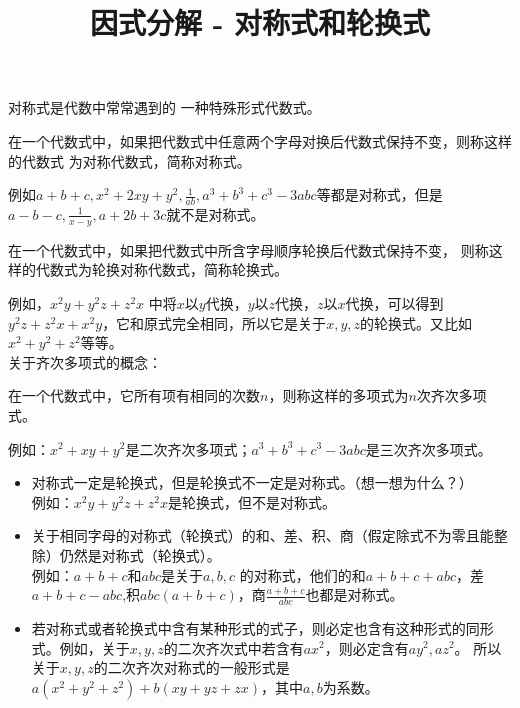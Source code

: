 \documentclass[windows,csize4]{BHCexam}
\title{因式分解 - 对称式和轮换式}
\begin{document}
\maketitle

\begin{groups}
    对称式是代数中常常遇到的 一种特殊形式代数式。\\
    \fbox
    {
        \parbox{\textwidth}
        {
            在一个代数式中，如果把代数式中任意两个字母对换后代数式保持不变，则称这样的代数式
            为对称代数式，简称对称式。
        }
    }
    例如$a+b+c,x^2+2xy+y^2,\frac{1}{ab},a^3+b^3+c^3-3abc$等都是对称式，但是
    $a-b-c,\frac{1}{x-y},a+2b+3c$就不是对称式。 \\

    \fbox
    {
        \parbox{\textwidth}
        {
            在一个代数式中，如果把代数式中所含字母顺序轮换后代数式保持不变，
            则称这样的代数式为轮换对称代数式，简称轮换式。
        }
    }
    例如，$x^2y+y^2z+z^2x$ 中将$x$以$y$代换，$y$以$z$代换，$z$以$x$代换，可以得到
    $y^2z+z^2x+x^2y$，它和原式完全相同，所以它是关于$x,y,z$的轮换式。又比如$x^2+y^2+z^2$等等。 \\

    关于齐次多项式的概念： \\
    \fbox
    {
        \parbox{\textwidth}
        {
            在一个代数式中，它所有项有相同的次数$n$，则称这样的多项式为$n$次齐次多项式。
        }
    }
    例如：$x^2+xy+y^2$是二次齐次多项式；$a^3+b^3+c^3-3abc$是三次齐次多项式。


    \begin{itemize}
        \item 对称式一定是轮换式，但是轮换式不一定是对称式。（想一想为什么？）\\
              例如：$x^2y+y^2z+z^2x$是轮换式，但不是对称式。
        \item 关于相同字母的对称式（轮换式）的和、差、积、商（假定除式不为零且能整除）仍然是对称式（轮换式）。\\
              例如：$a+b+c$和$abc$是关于$a,b,c$ 的对称式，他们的和$a+b+c+abc$，差$a+b+c-abc$,积$abc(a+b+c)$，商$\frac{a+b+c}{abc}$也都是对称式。
        \item 若对称式或者轮换式中含有某种形式的式子，则必定也含有这种形式的同形式。例如，关于$x,y,z$的二次齐次式中若含有$ax^2$，则必定含有$ay^2,az^2$。
              所以关于$x,y,z$的二次齐次对称式的一般形式是$a(x^2+y^2+z^2)+b(xy+yz+zx)$，其中$a,b$为系数。
    \end{itemize}


\end{groups}
\end{document}

